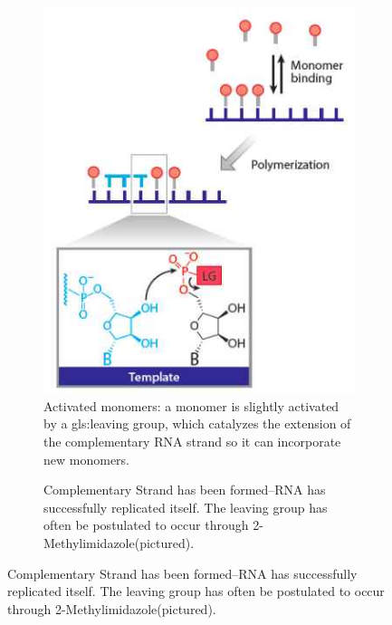 \documentclass[]{article}
\begin{document}
\begin{figure}[H]
\begin{subfigure}[m]{0.45\textwidth}
	\end{subfigure}
	\begin{subfigure}[b]{0.45\textwidth}
		\caption{Activated monomers: a monomer is slightly activated by a \gls{gls:leaving group}, which catalyzes the extension of the complementary RNA strand so it can incorporate new monomers.}\label{fig:RNA_polymerization_somehow1}
		\includegraphics[width=\textwidth]{RNA_polymerization_somehow1}
	\end{subfigure}
	\begin{subfigure}[b]{0.45\textwidth}
		\caption{Complementary Strand has been formed--RNA has successfully replicated itself. The leaving group has often be postulated to occur through 2-Methylimidazole(pictured).}\label{fig:self:rep:complete}

\end{subfigure}
\end{figure}
\end{document}
